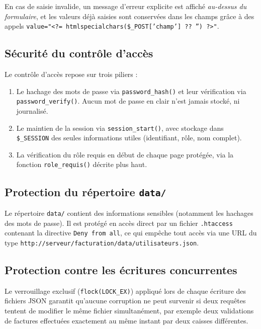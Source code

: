 \documentclass[12pt,a4paper]{article}
\begin{document}
En cas de saisie invalide, un message d'erreur explicite est affiché \textit{au-dessus du formulaire}, et les valeurs déjà saisies sont conservées dans les champs grâce à des appels \texttt{value="<?= htmlspecialchars(\$\_POST['champ'] ?? '') ?>"}.

\subsection{Sécurité du contrôle d'accès}

Le contrôle d'accès repose sur trois piliers :

\begin{enumerate}[leftmargin=1.5em]
    \item Le hachage des mots de passe via \texttt{password\_hash()} et leur vérification via \texttt{password\_verify()}. Aucun mot de passe en clair n'est jamais stocké, ni journalisé.
    \item Le maintien de la session via \texttt{session\_start()}, avec stockage dans \texttt{\$\_SESSION} des seules informations utiles (identifiant, rôle, nom complet).
    \item La vérification du rôle requis en début de chaque page protégée, via la fonction \texttt{role\_requis()} décrite plus haut.
\end{enumerate}

\subsection{Protection du répertoire \texttt{data/}}

Le répertoire \texttt{data/} contient des informations sensibles (notamment les hachages des mots de passe). Il est protégé en accès direct par un fichier \texttt{.htaccess} contenant la directive \texttt{Deny from all}, ce qui empêche tout accès via une URL du type \texttt{http://serveur/facturation/data/utilisateurs.json}.

\subsection{Protection contre les écritures concurrentes}

Le verrouillage exclusif (\texttt{flock(LOCK\_EX)}) appliqué lors de chaque écriture des fichiers JSON garantit qu'aucune corruption ne peut survenir si deux requêtes tentent de modifier le même fichier simultanément, par exemple deux validations de factures effectuées exactement au même instant par deux caisses différentes.
\end{document}
